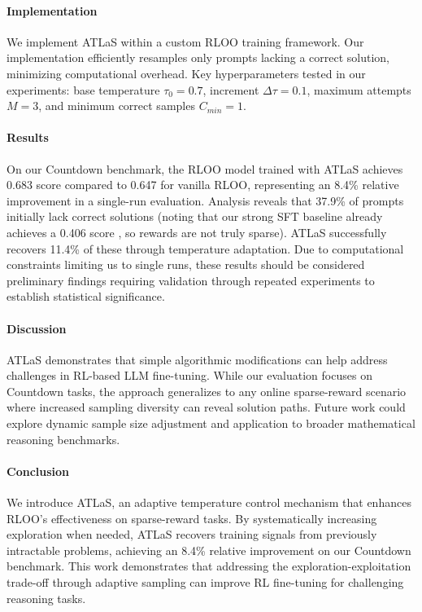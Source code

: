 \documentclass{article}
\begin{document}
\begin{titlepage}
\paragraph{Implementation} We implement ATLaS within a custom RLOO training framework. Our implementation efficiently resamples only prompts lacking a correct solution, minimizing computational overhead. Key hyperparameters tested in our experiments: base temperature $\tau_0=0.7$, increment $\Delta\tau=0.1$, maximum attempts $M=3$, and minimum correct samples $C_{min}=1$. 

\paragraph{Results} On our Countdown benchmark, the RLOO model trained with ATLaS achieves 0.683 score compared to 0.647 for vanilla RLOO, representing an 8.4\% relative improvement in a single-run evaluation. Analysis reveals that 37.9\% of prompts initially lack correct solutions (noting that our strong SFT baseline already achieves a 0.406 score , so rewards are not truly sparse). ATLaS successfully recovers 11.4\% of these through temperature adaptation. Due to computational constraints limiting us to single runs, these results should be considered preliminary findings requiring validation through repeated experiments to establish statistical significance.

\paragraph{Discussion} ATLaS demonstrates that simple algorithmic modifications can help address challenges in RL-based LLM fine-tuning. While our evaluation focuses on Countdown tasks, the approach generalizes to any online sparse-reward scenario where increased sampling diversity can reveal solution paths. Future work could explore dynamic sample size adjustment and application to broader mathematical reasoning benchmarks.

\paragraph{Conclusion} We introduce ATLaS, an adaptive temperature control mechanism that enhances RLOO's effectiveness on sparse-reward tasks. By systematically increasing exploration when needed, ATLaS recovers training signals from previously intractable problems, achieving an 8.4\% relative improvement on our Countdown benchmark. This work demonstrates that addressing the exploration-exploitation trade-off through adaptive sampling can improve RL fine-tuning for challenging reasoning tasks.

\end{titlepage}
\end{document}
